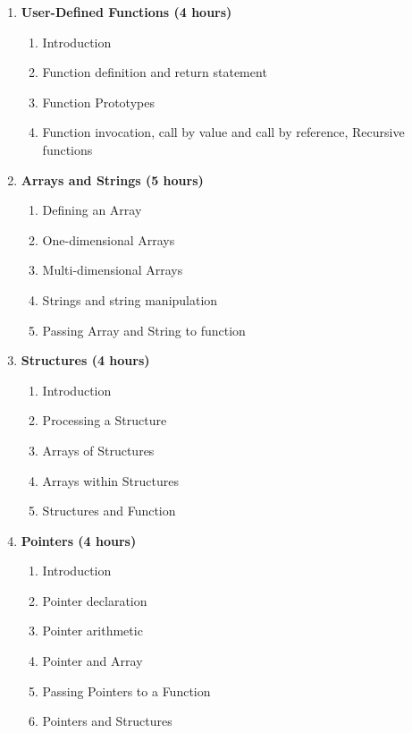 \begin{enumerate}
    \item \textbf{ User-Defined Functions \hfill (4 hours)}
    \begin{enumerate}
        \item Introduction
        \item Function definition and return statement
        \item Function Prototypes
        \item Function invocation, call by value and call by reference, Recursive functions
    \end{enumerate}
    
    \item \textbf{ Arrays and Strings \hfill (5 hours) }
    \begin{enumerate}
        \item Defining an Array
        \item One-dimensional Arrays
        \item Multi-dimensional Arrays
        \item Strings and string manipulation
        \item Passing Array and String to function
    \end{enumerate}
    
    \item \textbf{ Structures \hfill (4 hours) }
    \begin{enumerate}
        \item Introduction 
        \item Processing a Structure
        \item Arrays of Structures
        \item Arrays within Structures 
        \item Structures and Function
    \end{enumerate}
    
    \item \textbf{ Pointers \hfill (4 hours) }
    \begin{enumerate}
        \item Introduction
        \item Pointer declaration
        \item Pointer arithmetic
        \item Pointer and Array
        \item Passing Pointers to a Function
        \item Pointers and Structures
    \end{enumerate}
    

\end{enumerate}
